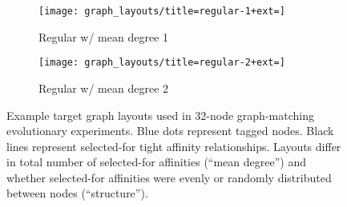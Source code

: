 \begin{figure}
\begin{center}
\begin{minipage}{0.95\textwidth}
\begin{minipage}{0.95\linewidth}
\end{minipage}

\vspace{2ex}

\begin{minipage}{\textwidth}

\begin{minipage}{0.05\linewidth}
\large
{}
\end{minipage}%
\begin{minipage}{0.95\linewidth}
\begin{subfigure}[b]{0.5\textwidth}
\centering
\texttt{[image: graph\_layouts/title=regular-1+ext=]}%
\caption{
Regular w/ mean degree 1
}
\label{fig:regular_degree_1}
\label{fig:regular_1}
\end{subfigure}
\begin{subfigure}[b]{0.5\textwidth}
\centering
\texttt{[image: graph\_layouts/title=regular-2+ext=]}%
\caption{
Regular w/ mean degree 2
}
\label{fig:regular_degree_2}
\label{fig:regular_2}
\end{subfigure}
\end{minipage}
\end{minipage}
\end{minipage}

\caption{
Example target graph layouts used in 32-node graph-matching evolutionary experiments.
Blue dots represent tagged nodes.
Black lines represent selected-for tight affinity relationships.
Layouts differ in total number of selected-for affinities (``mean degree'') and whether selected-for affinities were evenly or randomly distributed between nodes (``structure'').
}
\label{fig:graph_layouts}


\end{center}
\end{figure}
